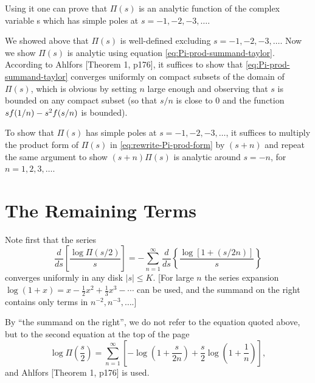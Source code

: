 \documentclass{note}
\numberwithin{equation}{chapter}
\begin{document}
\begin{quotebar}
    Using it one can prove that $\Pi(s)$ is an analytic function of the complex
    variable s which has simple poles at $s = -1, -2, -3, \dots$.
\end{quotebar}

We showed above that $\Pi(s)$ is well-defined excluding $s = -1, -2, -3,
    \dots$. Now we show $\Pi(s)$ is analytic using equation
\eqref{eq:Pi-prod-summand-taylor}. According to Ahlfors [Theorem 1, p176], it
suffices to show that \eqref{eq:Pi-prod-summand-taylor} converges uniformly on
compact subsets of the domain of $\Pi(s)$, which is obvious by setting $n$
large enough and observing that $s$ is bounded on any compact subset (so that
$s/n$ is close to $0$ and the function $s f\prn{1/n} - s^2 f\prn{s/n}$ is
bounded).

To show that $\Pi(s)$ has simple poles at $s = -1, -2, -3, \dots$, it suffices
to multiply the product form of $\Pi(s)$ in \eqref{eq:rewrite-Pi-prod-form} by
$(s+n)$ and repeat the same argument to show $(s+n)\Pi(s)$ is analytic around
$s = -n$, for $n = 1, 2, 3, \dots$.

\setcounter{section}{15}
\section{The Remaining Terms}


\begin{quotebar}
    Note first that the series
    \[
        \frac{d}{ds} \left[ \frac{\log \Pi(s/2)}{s} \right] = -\sum_{n=1}^\infty
        \frac{d}{ds} \left\{ \frac{\log[1 + (s/2n)]}{s} \right\}
    \]
    converges uniformly in any disk $|s| \leq K$. [For large $n$ the series
            expansion $\log(1 + x) = x - \frac{1}{2}x^2 + \frac{1}{3}x^3 - \cdots$ can be
            used, and the summand on the right contains only terms in $n^{-2}, n^{-3},
                \ldots.$]
\end{quotebar}

By ``the summand on the right'', we do not refer to the equation quoted above,
but to the second equation at the top of the page
\[
    \log \Pi\left(\frac{s}{2}\right) = \sum_{n=1}^\infty \left[ -\log\left(1 +
        \frac{s}{2n}\right) + \frac{s}{2} \log\left(1 + \frac{1}{n}\right)
        \right],
\]
and Ahlfors [Theorem 1, p176] is used.
\end{document}
